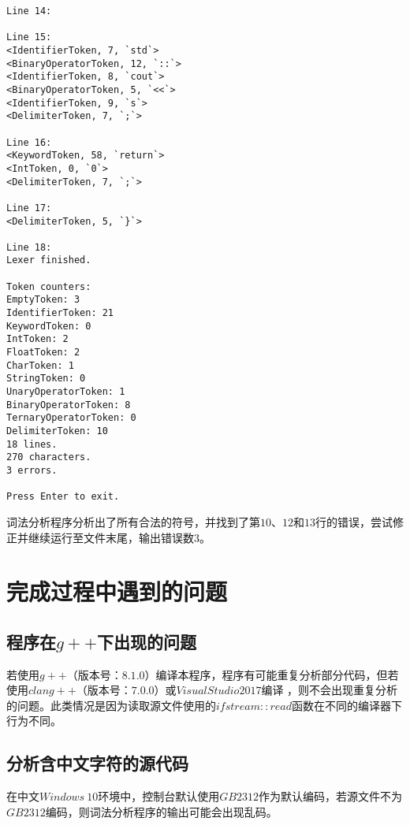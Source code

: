 \documentclass[UTF8]{ctexart}
\begin{document}
\begin{verbatim}
Line 14:

Line 15:
<IdentifierToken, 7, `std`>
<BinaryOperatorToken, 12, `::`>
<IdentifierToken, 8, `cout`>
<BinaryOperatorToken, 5, `<<`>
<IdentifierToken, 9, `s`>
<DelimiterToken, 7, `;`>

Line 16:
<KeywordToken, 58, `return`>
<IntToken, 0, `0`>
<DelimiterToken, 7, `;`>

Line 17:
<DelimiterToken, 5, `}`>

Line 18:
Lexer finished.

Token counters:
EmptyToken: 3
IdentifierToken: 21
KeywordToken: 0
IntToken: 2
FloatToken: 2
CharToken: 1
StringToken: 0
UnaryOperatorToken: 1
BinaryOperatorToken: 8
TernaryOperatorToken: 0
DelimiterToken: 10
18 lines.
270 characters.
3 errors.

Press Enter to exit.
  \end{verbatim}
词法分析程序分析出了所有合法的符号，并找到了第$10$、$12$和$13$行的错误，尝试修正并继续运行至文件末尾，输出错误数$3$。
\section{完成过程中遇到的问题}
\subsection{程序在$g++$下出现的问题}
若使用$g++$（版本号：$8.1.0$）编译本程序，程序有可能重复分析部分代码，但若使用$clang++$（版本号：$7.0.0$）或$Visual Studio 2017$编译
，则不会出现重复分析的问题。此类情况是因为读取源文件使用的$ifstream::read$函数在不同的编译器下行为不同。
\subsection{分析含中文字符的源代码}
在中文$Windows \ 10$环境中，控制台默认使用$GB2312$作为默认编码，若源文件不为$GB2312$编码，则词法分析程序的输出可能会出现乱码。
\end{document}
